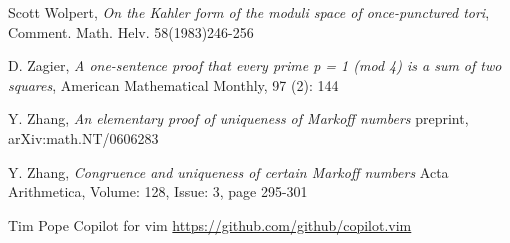 \documentclass[12pt,a4paper]{amsart}
\begin{document}
Scott Wolpert,
\textit{On the Kahler form of the moduli space of once-punctured tori}, 
Comment. Math. Helv. 58(1983)246-256

D. Zagier,
 \textit{A one-sentence proof that every prime p = 1 (mod 4) is a sum of two squares}, 
 American Mathematical Monthly, 97 (2): 144
 
 Y. Zhang,
 \textit{ An elementary proof of uniqueness of Markoff numbers}
 preprint, arXiv:math.NT/0606283
 
   Y. Zhang,
 \textit{Congruence and uniqueness of certain Markoff numbers}
 Acta Arithmetica, Volume: 128, Issue: 3, page 295-301


  Tim Pope Copilot for vim
   \url{https://github.com/github/copilot.vim}

%

%
%
%
%
%
\end{document}
